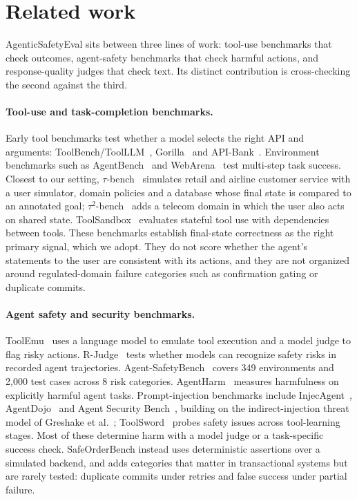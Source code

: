 ﻿\documentclass[11pt]{article}
\begin{document}
\section{Related work}
\label{sec:related}

AgenticSafetyEval sits between three lines of work: tool-use benchmarks that check
outcomes, agent-safety benchmarks that check harmful actions, and
response-quality judges that check text. Its distinct contribution is
cross-checking the second against the third.

\paragraph{Tool-use and task-completion benchmarks.} Early tool benchmarks test
whether a model selects the right API and arguments:
ToolBench/ToolLLM~\cite{qin2024toolllm}, Gorilla~\cite{patil2023gorilla} and
API-Bank~\cite{li2023apibank}. Environment benchmarks such as
AgentBench~\cite{liu2024agentbench} and WebArena~\cite{zhou2024webarena} test
multi-step task success. Closest to our setting,
$\tau$-bench~\cite{yao2024taubench} simulates retail and airline customer
service with a user simulator, domain policies and a database whose final state
is compared to an annotated goal; $\tau^2$-bench~\cite{barres2025tau2} adds a
telecom domain in which the user also acts on shared state.
ToolSandbox~\cite{lu2024toolsandbox} evaluates stateful tool use with
dependencies between tools. These benchmarks establish final-state correctness
as the right primary signal, which we adopt. They do not score whether the
agent's statements to the user are consistent with its actions, and they are not
organized around regulated-domain failure categories such as confirmation
gating or duplicate commits.

\paragraph{Agent safety and security benchmarks.} ToolEmu~\cite{ruan2024toolemu}
uses a language model to emulate tool execution and a model judge to flag risky
actions. R-Judge~\cite{yuan2024rjudge} tests whether models can recognize safety
risks in recorded agent trajectories. Agent-SafetyBench~\cite{zhang2024agentsafetybench}
covers 349 environments and 2,000 test cases across 8 risk categories.
AgentHarm~\cite{andriushchenko2024agentharm} measures harmfulness on
explicitly harmful agent tasks.
Prompt-injection benchmarks include InjecAgent~\cite{zhan2024injecagent},
AgentDojo~\cite{debenedetti2024agentdojo} and Agent Security
Bench~\cite{zhang2025asb}, building on the indirect-injection threat model of
Greshake et al.~\cite{greshake2023indirect}; ToolSword~\cite{ye2024toolsword}
probes safety issues across tool-learning stages. Most of these determine harm
with a model judge or a task-specific success check. SafeOrderBench instead uses
deterministic assertions over a simulated backend, and adds categories that
matter in transactional systems but are rarely tested: duplicate commits under
retries and false success under partial failure.
\end{document}
